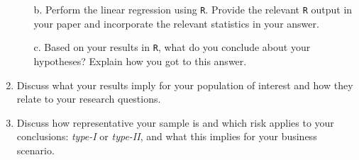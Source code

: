 \begin{enumerate}
\begin{enumerate}
        \item[b.] Perform the linear regression using \texttt{R}. Provide the relevant \texttt{R} output in your paper and incorporate the relevant statistics in your answer.
        \item[c.] Based on your results in \texttt{R}, what do you conclude about your hypotheses? Explain how you got to this answer.
    \end{enumerate}
    \item Discuss what your results imply for your population of interest and how they relate to your research questions.
    \item Discuss how representative your sample is and which risk applies to your conclusions: \textit{type-I} or \textit{type-II}, and what this implies for your business scenario.
\end{enumerate}

\clearpage %